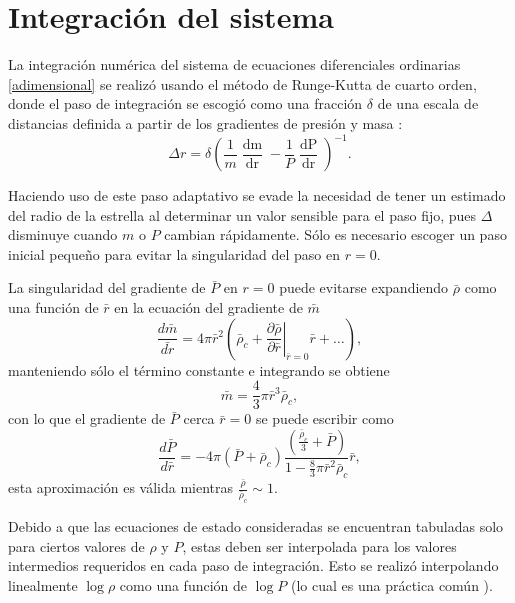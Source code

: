 \section{Integración del sistema}

\noindent La integración numérica del sistema de ecuaciones diferenciales ordinarias \eqref{adimensional} se realizó usando el método de Runge-Kutta de cuarto orden, donde el paso de integración se escogió como una fracción $\delta$ de una escala de distancias definida a partir de los gradientes de presión y masa \cite{Baym1971}: 
\begin{equation}\label{adaptivestep}
    \Delta{r} = \delta \left( \frac { 1 } { m } \frac { \mathop{dm} } { \mathop{dr}  } - \frac { 1 } { P } \frac { \mathop{dP}  } { \mathop{dr} } \right) ^ { - 1 }.
\end{equation}

Haciendo uso de este paso adaptativo se evade la necesidad de tener un estimado del radio de la estrella al determinar un valor sensible para el paso fijo, pues $\Delta$ disminuye cuando $m$ o $P$ cambian rápidamente. Sólo es necesario escoger un paso inicial pequeño para evitar la singularidad del paso en $r=0$.

La singularidad del gradiente de $\bar{P}$ en $r=0$ puede evitarse expandiendo $\bar{\rho}$ como una función de $\bar{r}$ en la ecuación del gradiente de $\bar{m}$
\begin{equation*}
    \frac{d\bar{m}}{\bar{dr}}=4\pi \bar{r}^2 \left(  \bar{\rho} _ { c } + \left. \frac { \partial \bar{\rho }} { \partial \bar{r} } \right| _ { \bar{r} = 0 } \bar{r} + \ldots \right),
\end{equation*}
manteniendo sólo el término constante e integrando se obtiene
\begin{equation*}
    \bar{m}  =  \frac { 4 } { 3 } \pi \bar{r} ^ { 3 } \bar{\rho} _ { c },
\end{equation*}
con lo que el gradiente de $\bar{P}$ cerca $\bar{r}=0$ se puede escribir como
\begin{equation}
    \frac{d\bar{P}}{d\bar{r}} = -4\pi (\bar{P}+\bar{\rho}_c)\frac{\left(\frac{\bar{\rho}_c}{3}+\bar{P}\right)}{1-\frac{8}{3}\pi\bar{r}^2\bar{\rho}_c} \bar{r},
\end{equation}
esta aproximación es válida mientras $ \frac{\bar{\rho}}{\bar{\rho}_{c}} \sim 1$.

Debido a que las ecuaciones de estado consideradas se encuentran tabuladas solo para ciertos valores de $\rho$ y $P$, estas deben ser interpolada para los valores intermedios requeridos en cada paso de integración. Esto se realizó interpolando linealmente $\log{\rho}$ como una función de $\log{P}$ (lo cual es una práctica común \cite{Haensel2007}).

